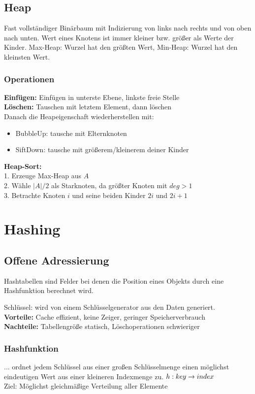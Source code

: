\documentclass[fs, footer]{latex4ei}
\begin{document}
\begin{multicols*}{4}
{{\subsection{Heap}
Fast vollständiger Binärbaum mit Indizierung von links nach rechts und von oben nach unten.
Wert eines Knotens ist immer kleiner bzw. größer als Werte der Kinder. 
Max-Heap: Wurzel hat den größten Wert, Min-Heap: Wurzel hat den kleinsten Wert.\\
\subsubsection{Operationen}
\textbf{Einfügen:} Einfügen in unterste Ebene, linkste freie Stelle\\
\textbf{Löschen:} Tauschen mit letztem Element, dann löschen\\
Danach die Heapeigenschaft wiederherstellen mit:
\begin{itemize}
	\item BubbleUp: tausche mit Elternknoten
	\item SiftDown: tausche mit größerem/kleinerem deiner Kinder
\end{itemize}

\textbf{Heap-Sort:}\\
1. Erzeuge Max-Heap aus $A$\\
2. Wähle $|A| / 2$ als Starknoten, da größter Knoten mit $deg > 1$\\
3. Betrachte Knoten $i$ und seine beiden Kinder $2i$ und $2i+1$ \\

\section{Hashing}
\subsection{Offene Adressierung}
	Hashtabellen sind Felder bei denen die Position eines Objekts durch eine Hashfunktion berechnet wird.

	Schlüssel: wird von einem Schlüsselgenerator aus den Daten generiert. \\
	\textbf{Vorteile:} Cache effizient, keine Zeiger, geringer Speicherverbrauch \\
	\textbf{Nachteile:} Tabellengröße statisch, Löschoperationen schwieriger
\subsubsection{Hashfunktion}
	... ordnet jedem Schlüssel aus einer großen Schlüsselmenge einen möglichst eindeutigen Wert aus einer kleineren Indexmenge zu.
	$h: key \rightarrow index$\\
	Ziel: Möglichst gleichmäßige Verteilung aller Elemente\\
	
}}
\end{multicols*}
\end{document}
